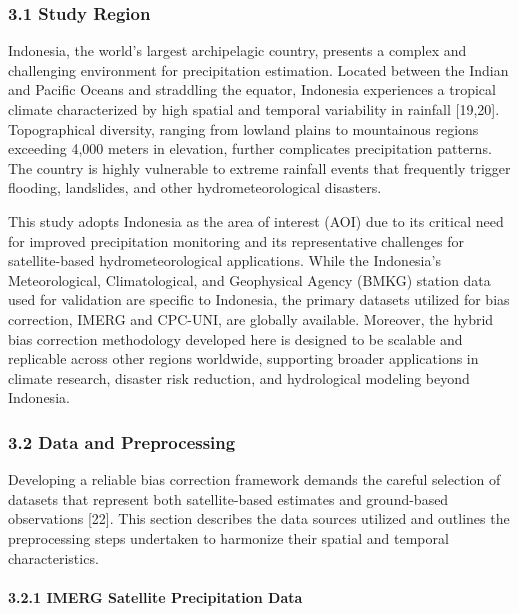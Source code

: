 \documentclass[
]{article}
\begin{document}
\subsubsection{3.1 Study Region}\label{study-region}

Indonesia, the world's largest archipelagic country, presents a complex
and challenging environment for precipitation estimation. Located
between the Indian and Pacific Oceans and straddling the equator,
Indonesia experiences a tropical climate characterized by high spatial
and temporal variability in rainfall {[}19,20{]}. Topographical
diversity, ranging from lowland plains to mountainous regions exceeding
4,000 meters in elevation, further complicates precipitation patterns.
The country is highly vulnerable to extreme rainfall events that
frequently trigger flooding, landslides, and other hydrometeorological
disasters.

This study adopts Indonesia as the area of interest (AOI) due to its
critical need for improved precipitation monitoring and its
representative challenges for satellite-based hydrometeorological
applications. While the Indonesia's Meteorological, Climatological, and
Geophysical Agency (BMKG) station data used for validation are specific
to Indonesia, the primary datasets utilized for bias correction, IMERG
and CPC-UNI, are globally available. Moreover, the hybrid bias
correction methodology developed here is designed to be scalable and
replicable across other regions worldwide, supporting broader
applications in climate research, disaster risk reduction, and
hydrological modeling beyond Indonesia.

\subsubsection{3.2 Data and Preprocessing}\label{data-and-preprocessing}

Developing a reliable bias correction framework demands the careful
selection of datasets that represent both satellite-based estimates and
ground-based observations {[}22{]}. This section describes the data
sources utilized and outlines the preprocessing steps undertaken to
harmonize their spatial and temporal characteristics.

\paragraph{3.2.1 IMERG Satellite Precipitation
Data}\label{imerg-satellite-precipitation-data}
\end{document}
